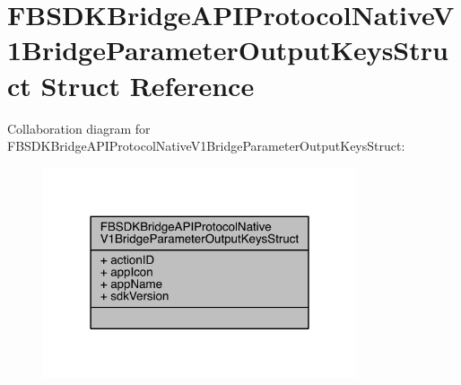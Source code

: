 \hypertarget{struct_f_b_s_d_k_bridge_a_p_i_protocol_native_v1_bridge_parameter_output_keys_struct}{\section{F\-B\-S\-D\-K\-Bridge\-A\-P\-I\-Protocol\-Native\-V1\-Bridge\-Parameter\-Output\-Keys\-Struct Struct Reference}
\label{struct_f_b_s_d_k_bridge_a_p_i_protocol_native_v1_bridge_parameter_output_keys_struct}
}


Collaboration diagram for F\-B\-S\-D\-K\-Bridge\-A\-P\-I\-Protocol\-Native\-V1\-Bridge\-Parameter\-Output\-Keys\-Struct\-:
\nopagebreak
\begin{figure}[H]
\begin{center}
\leavevmode
\includegraphics[width=262pt]{struct_f_b_s_d_k_bridge_a_p_i_protocol_native_v1_bridge_parameter_output_keys_struct__coll__graph}
\end{center}
\end{figure}

